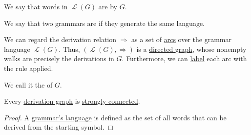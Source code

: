 \begin{definition}
\begin{thmenum}
    We say that words in \( \mscrL(G) \) are  by \( G \).

     We say that two grammars are  if they generate the same language.

    \mimprovised We can regard the derivation relation \( \Rightarrow \) as a set of \hyperref[def:directed_multigraph/arcs]{arcs} over the grammar language \( \mscrL(G) \). Thus, \( (\mscrL(G), \Rightarrow) \) is a \hyperref[def:directed_graph]{directed graph}, whose nonempty walks are precisely the derivations in \( G \). Furthermore, we can \hyperref[def:labeled_set]{label} each arc with the rule applied.

    We call it the  of \( G \).
  \end{thmenum}
\end{definition}

\begin{proposition}\label{thm:derivation_graph_connected}
  Every \hyperref[def:formal_grammar/graph]{derivation graph} is \hyperref[def:graph_connectedness/strong]{strongly connected}.
\end{proposition}
\begin{proof}
  A \hyperref[def:formal_grammar/language]{grammar's language} is defined as the set of all words that can be derived from the starting symbol.
\end{proof}

